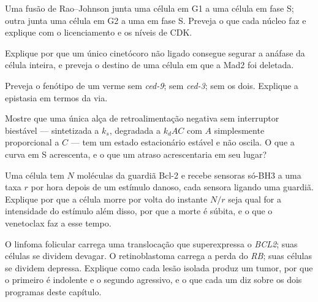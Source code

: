 \begin{exercise}[$\star\star$]\label{exo:b3:cell-cycle-apoptosis:7}
Uma fusão de Rao--Johnson junta uma célula em G1 a uma célula em fase
S; outra junta uma célula em G2 a uma em fase S. Preveja o que cada
núcleo faz e explique com o licenciamento e os níveis de CDK.
\end{exercise}

\begin{exercise}[$\star\star$]\label{exo:b3:cell-cycle-apoptosis:8}
Explique por que um único cinetócoro não ligado consegue segurar a
anáfase da célula inteira, e preveja o destino de uma célula em que a
Mad2 foi deletada.
\end{exercise}

\begin{exercise}[$\star\star$]\label{exo:b3:cell-cycle-apoptosis:9}
Preveja o fenótipo de um verme sem \emph{ced-9}; sem \emph{ced-3}; sem
os dois. Explique a epistasia em termos da via.
\end{exercise}

\begin{exercise}[$\star\star\star$]\label{exo:b3:cell-cycle-apoptosis:10}
Mostre que uma única alça de retroalimentação negativa sem interruptor
biestável ---  sintetizada a $k_{s}$, degradada a $k_{d}AC$ com
$A$ simplesmente proporcional a $C$ --- tem um estado estacionário
estável e não oscila. O que a curva em S acrescenta, e o que um atraso
acrescentaria em seu lugar?
\end{exercise}

\begin{exercise}[$\star\star\star$]\label{exo:b3:cell-cycle-apoptosis:11}
Uma célula tem $N$ moléculas da guardiã Bcl-2 e recebe sensoras só-BH3
a uma taxa $r$ por hora depois de um estímulo danoso, cada sensora
ligando uma guardiã. Explique por que a célula morre por volta do
instante $N/r$ seja qual for a intensidade do estímulo além disso, por
que a morte é súbita, e o que o venetoclax faz a esse tempo.
\end{exercise}

\begin{exercise}[$\star\star\star$]\label{exo:b3:cell-cycle-apoptosis:12}
O linfoma folicular carrega uma translocação que superexpressa o
\emph{BCL2}; suas células se dividem devagar. O retinoblastoma carrega
a perda do \emph{RB}; suas células se dividem depressa. Explique como
cada lesão isolada produz um tumor, por que o primeiro é indolente e o
segundo agressivo, e o que cada um diz sobre os dois programas deste
capítulo.
\end{exercise}

